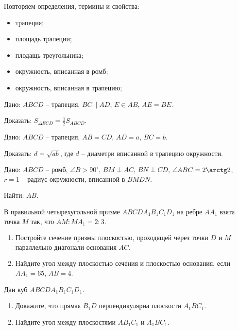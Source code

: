 \documentclass[geometry,a5paper]{pum}
\date{14.04.20}
\begin{document}
Повторяем определения, термины и свойства:
\begin{itemize}
  \item трапеция;
  \item площадь трапеции;
  \item плодащь треугольника;
  \item окружность, вписанная в ромб;
  \item окружность, вписанная в трапецию;
\end{itemize}


\begin{exercises}
  \begin{question}
    Дано: $ABCD$ -- трапеция, $BC\parallel AD$, $E\in AB$, $AE=BE$.

    Доказать: $S_{\Delta ECD}=\frac{1}{2}S_{ABCD}$.
  \end{question}
  \begin{question}
    Дано: $ABCD$ -- трапеция, $AB=CD$, $AD=a$, $BC=b$.

    Доказать: $d=\sqrt{ab}$, где $d$ -- диаметри вписанной в трапецию окружности.
  \end{question}
  \begin{question}
    Дано: $ABCD$ -- ромб, $\angle B>90^\circ$, $BM\perp AC$, $BN\perp CD$, $\angle ABC = 2\arctg 2$, $r=1$ -- радиус окружности, вписанной в $BMDN$.

    Найти: $AB$.
  \end{question}

  \begin{question}
    В правильной четырехугольной призме $ABCDA_1 B_1 C_1 D_1$ на ребре $AA_1$ взята точка $M$ так, что $AM : MA_1 = 2 : 3$.
    \begin{enumerate}[label=\asbuk*)]
    \item Постройте сечение призмы плоскостью, проходящей через точки $D$ и $M$ параллельно диагонали основания $AC$.
    \item Найдите угол между плоскостью сечения и плоскостью основания, если $AA_1 = 65$, $AB=4$.
    \end{enumerate}
  \end{question}

  \begin{question}
    Дан куб $ABCDA_1 B_1 C_1 D_1$.
    \begin{enumerate}[label=\asbuk*)]
    \item Докажите, что прямая $B_1D$ перпендикулярна плоскости $A_1 BC_1$.
    \item Найдите угол между плоскостями $AB_1 C_1$ и $A_1BC_1$.
    \end{enumerate}
  \end{question}
\end{exercises}
\end{document}
